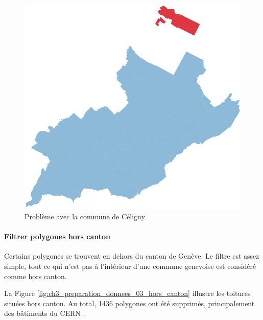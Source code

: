 \begin{figure}[H]
    \centering
    \includegraphics[width=1\linewidth]{02-main//figures//ch3/ch3_preparation_donnees_02_bug_celigny.png}
    \caption{Problème avec la commune de Céligny}
    \label{fig:ch3_preparation_donnees_02_bug_celigny}
\end{figure}

\newpage
\paragraph{Filtrer polygones hors canton}
Certains polygones se trouvent en dehors du canton de Genève. Le filtre est assez simple, tout ce qui n'est pas à l'intérieur d'une commune genevoise est considéré comme hors canton.

La Figure \ref{fig:ch3_preparation_donnees_03_hors_canton} illustre les toitures situées hors canton. Au total, 1436 polygones ont été supprimés, principalement des bâtiments du CERN \cite{cern_home_nodate}.

